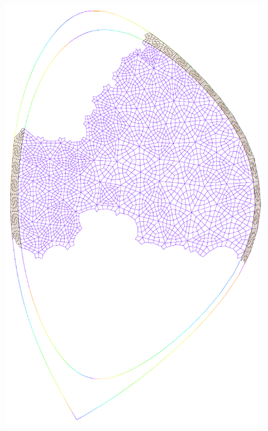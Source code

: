 \begin{figure}
{\includegraphics[scale=.5]{images/tokamak_layer_mesh_adapt_fine_1_par.pdf}}\quad
\subfigure[{rank = 2}\label{fig:tokamak_layer_mesh_adapt_fine_2_par}]

\end{figure}
